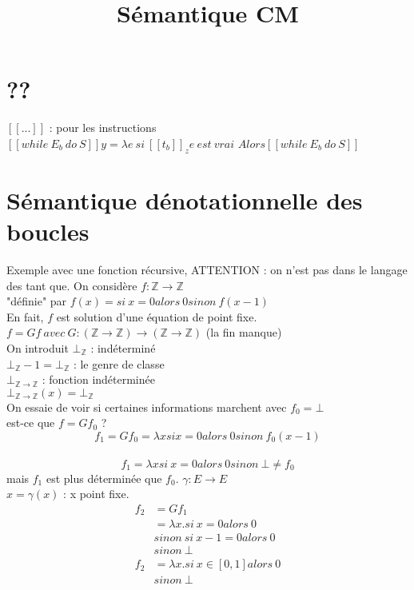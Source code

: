 \documentclass[11pt,a4paper]{article}
\title{Sémantique CM}
\begin{document}
	\maketitle
	
	\section{??}
	$[[...]]$ : pour les instructions\\
	$[[while\ E_{b}\ do\ S ]]y = \lambda e\ si\ [[t_{b}]]_{z} e\ est\ vrai$
	$Alors [[while\ E_{b}\ do\ S]]$

	\section{Sémantique dénotationnelle des boucles}

	Exemple avec une fonction récursive, ATTENTION : on n'est pas dans le langage des tant que.
	On considère $f: \mathbb{Z} \to \mathbb{Z}$\\
	"définie" par $f(x) = si\ x = 0 alors\ 0 sinon\ f(x - 1)$\\
	En fait, $f$ est solution d'une équation de point fixe.\\
	$f = Gf\ avec\ G : (\mathbb{Z} \to \mathbb{Z}) \to (\mathbb{Z} \to \mathbb{Z})$
	(la fin manque)\\
		
	On introduit $\bot_{\mathbb{Z}}$ : indéterminé\\
	$\bot_{\mathbb{Z}} - 1 = \bot_{\mathbb{Z}}$ : le genre de classe\\
	 $\bot_{\mathbb{Z} \to \mathbb{Z}}$ : fonction indéterminée\\
	 $\bot_{\mathbb{Z} \to \mathbb{Z}}(x) = \bot_{\mathbb{Z}}$\\
	 On essaie de voir si certaines informations marchent avec $f_{0} = \bot$\\
	 est-ce que $f = G f_{0}$ ?
	 $$f_{1} = G f_{0} = \lambda x si x = 0 alors\ 0 sinon\ f_{0}(x-1)$$\\
	 $$f_{1} = \lambda x si\ x = 0 alors\ 0 sinon\ \bot \neq f_{0}$$
	 mais $f_{1}$ est plus déterminée que $f_{0}$.
	 $\gamma : E \to E$\\
	 $x = \gamma(x)$ : x point fixe.
	 \begin{align*}
	 	f_{2} &= G f_{1}\\
	 	&= \lambda x . si\ x = 0 alors\ 0\\
	 	&sinon\ si\ x - 1 = 0 alors\ 0\\
	 	&sinon\ \bot\\
	 	f_{2} &= \lambda x . si\ x \in [0,1] alors\ 0\\
	 	&sinon\ \bot\\
	 \end{align*}
	 
\end{document}
